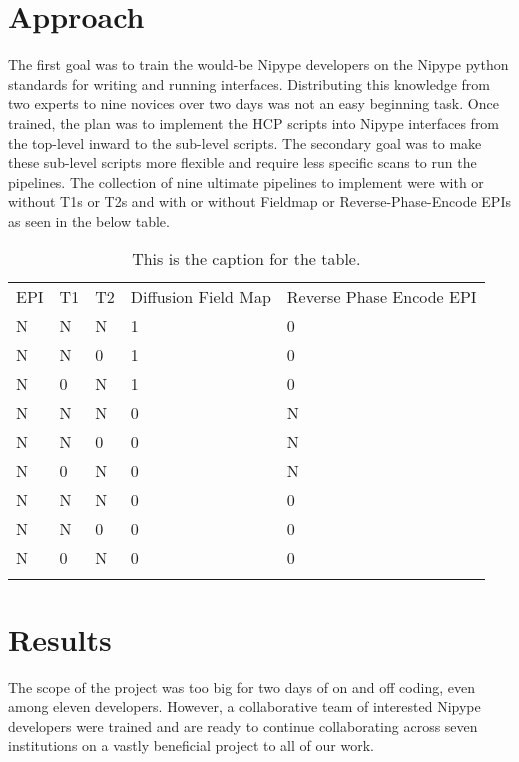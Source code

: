 \documentclass[twocolumn]{bmcart}%
\begin{document}
\section{Approach}\label{approach}

The first goal was to train the would-be Nipype developers on the Nipype
python standards for writing and running interfaces. Distributing this
knowledge from two experts to nine novices over two days was not an easy
beginning task. Once trained, the plan was to implement the HCP scripts
into Nipype interfaces from the top-level inward to the sub-level
scripts. The secondary goal was to make these sub-level scripts more
flexible and require less specific scans to run the pipelines. The
collection of nine ultimate pipelines to implement were with or without
T1s or T2s and with or without Fieldmap or Reverse-Phase-Encode EPIs as
seen in the below table.

\begin{table*}[t!]
\caption{\label{paramtable}This is the caption for the table.}
\begin{tabular}{l l l l l}
 \hline\noalign{\smallskip}
          EPI & T1 & T2 & Diffusion Field Map & Reverse Phase Encode EPI \\
    \noalign{\smallskip}
    \hline\noalign{\smallskip}
          N & N & N & 1 & 0 \\
          N & N & 0 & 1 & 0 \\
          N & 0 & N & 1 & 0 \\
          N & N & N & 0 & N \\
          N & N & 0 & 0 & N \\
          N & 0 & N & 0 & N \\
          N & N & N & 0 & 0 \\
          N & N & 0 & 0 & 0 \\
          N & 0 & N & 0 & 0 \\
  \noalign{\smallskip}\hline
\end{tabular}
\end{table*}

\section{Results}\label{results}

The scope of the project was too big for two days of on and off coding,
even among eleven developers. However, a collaborative team of
interested Nipype developers were trained and are ready to continue
collaborating across seven institutions on a vastly beneficial project
to all of our work.
\end{document}
